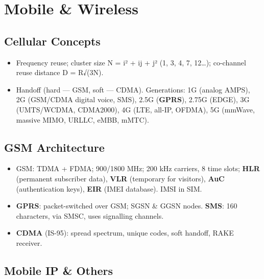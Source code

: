 \needspace{131pt}

\hypertarget{p2-09--12-mobile--wireless}{%
\section{Mobile \& Wireless}\label{p2-09--12-mobile--wireless}}

\needspace{95pt}

\hypertarget{p2-09--121-cellular-concepts}{%
\subsection{Cellular Concepts}\label{p2-09--121-cellular-concepts}}

\begin{itemize}
\tightlist
\item
  Frequency reuse; cluster size N = i² + ij + j² (1, 3, 4, 7, 12\ldots); co-channel reuse distance D = R√(3N).
\item
  Handoff (hard --- GSM, soft --- CDMA). Generations: 1G (analog AMPS), 2G (GSM/CDMA digital voice, SMS), 2.5G (\textbf{GPRS}), 2.75G (EDGE), 3G (UMTS/WCDMA, CDMA2000), 4G (LTE, all-IP, OFDMA), 5G (mmWave, massive MIMO, URLLC, eMBB, mMTC).
\end{itemize}

\needspace{95pt}

\hypertarget{p2-09--122-gsm-architecture}{%
\subsection{GSM Architecture}\label{p2-09--122-gsm-architecture}}



\begin{itemize}
\tightlist
\item
  GSM: TDMA + FDMA; 900/1800 MHz; 200 kHz carriers, 8 time slots; \textbf{HLR} (permanent subscriber data), \textbf{VLR} (temporary for visitors), \textbf{AuC} (authentication keys), \textbf{EIR} (IMEI database). IMSI in SIM.
\item
  \textbf{GPRS}: packet-switched over GSM; SGSN \& GGSN nodes. \textbf{SMS}: 160 characters, via SMSC, uses signalling channels.
\item
  \textbf{CDMA} (IS-95): spread spectrum, unique codes, soft handoff, RAKE receiver.
\end{itemize}

\needspace{95pt}

\hypertarget{p2-09--123-mobile-ip--others}{%
\subsection{Mobile IP \& Others}\label{p2-09--123-mobile-ip--others}}

